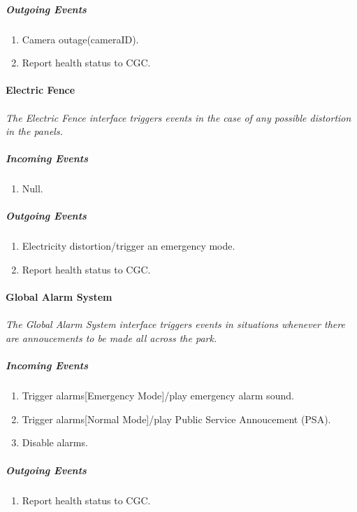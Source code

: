 \documentclass[12pt]{article}
\begin{document}
	    \subparagraph{Outgoing Events}
		\begin{enumerate}
			\item Camera outage(cameraID).
			\item Report health status to CGC. 
		\end{enumerate}

	\paragraph{Electric Fence}
	\paragraph{}\textit{The Electric Fence interface triggers events in the case of any possible distortion in the panels. }
	    \subparagraph{Incoming Events}
		\begin{enumerate}
			\item Null.
		\end{enumerate}
				
	    \subparagraph{Outgoing Events}
		\begin{enumerate}
		    \item Electricity distortion/trigger an emergency mode.
		    \item Report health status to CGC. 
		\end{enumerate}

	\paragraph{Global Alarm System}
	\paragraph{}\textit{The Global Alarm System interface triggers events in situations whenever there are annoucements to be made all across the park. }
	    \subparagraph{Incoming Events}
		\begin{enumerate}
			\item Trigger alarms[Emergency Mode]/play emergency alarm sound.
			\item Trigger alarms[Normal Mode]/play Public Service Annoucement (PSA).
			\item Disable alarms.
		\end{enumerate}
				
	    \subparagraph{Outgoing Events}
		\begin{enumerate}
			\item Report health status to CGC.
		\end{enumerate}
\end{document}
